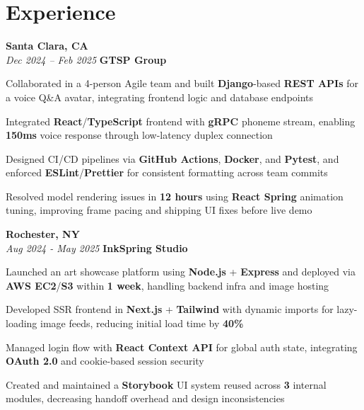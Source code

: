 \section{Experience}

\begin{twocolentry}{
    \textbf{Santa Clara, CA} \\
    \textit{Dec 2024 – Feb 2025}
}{
    \textbf{GTSP Group} \\
}
\end{twocolentry}
\begin{onecolentry}
    \begin{highlights}
        \item Collaborated in a 4-person Agile team and built \textbf{Django}-based \textbf{REST APIs} for a voice Q\&A avatar, integrating frontend logic and database endpoints
        \item Integrated \textbf{React}/\textbf{TypeScript} frontend with \textbf{gRPC} phoneme stream, enabling \textbf{150ms} voice response through low-latency duplex connection
        \item Designed CI/CD pipelines via \textbf{GitHub Actions}, \textbf{Docker}, and \textbf{Pytest}, and enforced \textbf{ESLint}/\textbf{Prettier} for consistent formatting across team commits
        \item Resolved model rendering issues in \textbf{12 hours} using \textbf{React Spring} animation tuning, improving frame pacing and shipping UI fixes before live demo
    \end{highlights}
\end{onecolentry}

\vspace{0.2cm}

\begin{twocolentry}{
    \textbf{Rochester, NY} \\
    \textit{Aug 2024 - May 2025}
}{
    \textbf{InkSpring Studio} \\
}
\end{twocolentry}
\begin{onecolentry}
    \begin{highlights}
        \item Launched an art showcase platform using \textbf{Node.js} + \textbf{Express} and deployed via \textbf{AWS EC2}/\textbf{S3} within \textbf{1 week}, handling backend infra and image hosting
        \item Developed SSR frontend in \textbf{Next.js} + \textbf{Tailwind} with dynamic imports for lazy-loading image feeds, reducing initial load time by \textbf{40\%}
        \item Managed login flow with \textbf{React Context API} for global auth state, integrating \textbf{OAuth 2.0} and cookie-based session security
        \item Created and maintained a \textbf{Storybook} UI system reused across \textbf{3} internal modules, decreasing handoff overhead and design inconsistencies
    \end{highlights}
\end{onecolentry}

